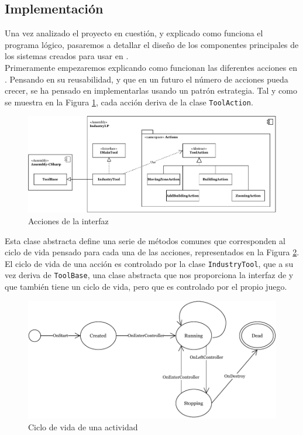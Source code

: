 \subsection{Implementación}
\label{subsec:implementacion}

Una vez analizado el proyecto en cuestión, y explicado como funciona el programa lógico, pasaremos a detallar el diseño de los componentes principales de los sistemas creados para usar en \cities. \\

Primeramente empezaremos explicando como funcionan las diferentes acciones en \industrylp. Pensando en su reusabilidad, y que en un futuro el número de acciones pueda crecer, se ha pensado en implementarlas usando un patrón estrategia. Tal y como se muestra en la Figura \ref{fig:actions}, cada acción deriva de la clase \texttt{ToolAction}.\\

\begin{figure}[!h]
	\centering
	\includegraphics[width=\textwidth]{images/actions}
	\caption{Acciones de la interfaz}
	\label{fig:actions}
\end{figure}

Esta clase abstracta define una serie de métodos comunes que corresponden al ciclo de vida pensado para cada una de las acciones, representados en la Figura \ref{fig:action-lifecycle}. El ciclo de vida de una acción es controlado por la clase \texttt{IndustryTool}, que a su vez deriva de \texttt{ToolBase}, una clase abstracta que nos proporciona la interfaz de \cities y que también tiene un ciclo de vida, pero que es controlado por el propio juego.

\begin{figure}[!h]
	\centering
	\includegraphics[width=\textwidth]{images/action-lifecycle}
	\caption{Ciclo de vida de una actividad}
	\label{fig:action-lifecycle}
\end{figure}

